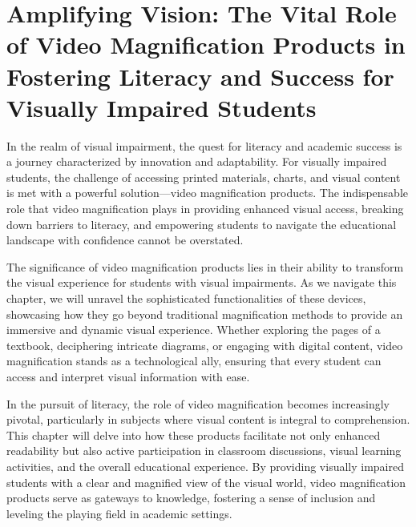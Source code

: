 \hypertarget{low-vision}{}\chapter[\raggedright Amplifying Vision:\hfill\break The Vital Role of Video Magnification Products in Fostering Literacy\hfill\break and Success for Visually Impaired Students]{Amplifying Vision: The Vital Role of Video Magnification Products in Fostering Literacy and Success for Visually Impaired Students}\label{low-vision}
\noindent\makebox[\linewidth]{\rule{\linewidth}{0.4pt}}
{\let\clearpage\relax\localtableofcontents\let\clearpage\relax\locallistoftables}\newpage
{}
In the realm of visual impairment, the quest for literacy and academic success is a journey characterized by innovation and adaptability. For visually impaired students, the challenge of accessing printed materials, charts, and visual content is met with a powerful solution—video magnification products. The indispensable role that video magnification plays in providing enhanced visual access, breaking down barriers to literacy, and empowering students to navigate the educational landscape with confidence cannot be overstated.

The significance of video magnification products lies in their ability to transform the visual experience for students with visual impairments. As we navigate this chapter, we will unravel the sophisticated functionalities of these devices, showcasing how they go beyond traditional magnification methods to provide an immersive and dynamic visual experience. Whether exploring the pages of a textbook, deciphering intricate diagrams, or engaging with digital content, video magnification stands as a technological ally, ensuring that every student can access and interpret visual information with ease.

In the pursuit of literacy, the role of video magnification becomes increasingly pivotal, particularly in subjects where visual content is integral to comprehension. This chapter will delve into how these products facilitate not only enhanced readability but also active participation in classroom discussions, visual learning activities, and the overall educational experience. By providing visually impaired students with a clear and magnified view of the visual world, video magnification products serve as gateways to knowledge, fostering a sense of inclusion and leveling the playing field in academic settings.

